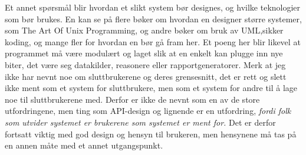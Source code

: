 \documentclass[11pt]{article}
\begin{document}
Et annet spørsmål blir hvordan et slikt system bør designes, og hvilke teknologier som bør brukes. En kan se på flere bøker om hvordan en designer større systemer, som The Art Of Unix Programming\cite{taoup}, og andre bøker om bruk av UML\cite{umlpatterns},sikker koding\cite{certguide}, og mange fler for hvordan en bør gå fram her. Et poeng her blir likevel at programmet må være modulært og laget slik at en enkelt kan plugge inn nye biter, det være seg datakilder, reasonere eller rapportgeneratorer. Merk at jeg ikke har nevnt noe om sluttbrukerene og deres grensesnitt, det er rett og slett ikke ment som et system for sluttbrukere, men som et system for andre til å lage noe til sluttbrukerene med. Derfor er ikke de nevnt som en av de store utfordringene, men ting som API-design og lignende er en utfordring, \emph{fordi folk som utvider systemet er brukerene som systemet er ment for.} Det er derfor fortsatt viktig med god design og hensyn til brukeren, men hensynene må tas på en annen måte med et annet utgangspunkt.
{}

\end{document}

